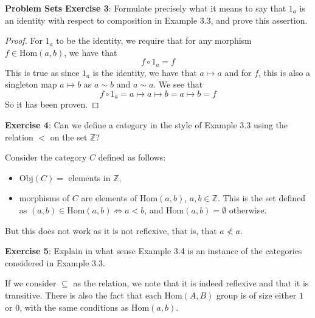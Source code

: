 \documentclass{report}
\begin{document}
\begin{exercises}{\textbf{Problem Sets}}
    \textbf{Exercise 3}: Formulate precisely what it means to say that $1_{a}$ is an identity with respect to composition in Example 3.3, and prove this assertion.
        \begin{proof}
            For $1_{a}$ to be the identity, we require that for any morphism $f \in \text{Hom}(a, b)$, we have that
            \begin{equation*}
                f \circ 1_{a} = f
            \end{equation*}
            This is true as since $1_{a}$ is the identity, we have that $a \mapsto a$ and for $f$, this is also a singleton map $a \mapsto b$ as $a \sim b$ and $a \sim a$. We see that
            \begin{equation*}
                f \circ 1_{a} = a \mapsto a \mapsto b = a \mapsto b = f
            \end{equation*}
            So it has been proven.
        \end{proof}

    \textbf{Exercise 4}: Can we define a category in the style of Example 3.3 using the relation $< $ on the set $\mathbb{Z}$?
        \begin{answer}
            Consider the category $C$ defined as follows:
                \begin{itemize}
                    \item $\text{Obj}(C) = $ elements in $\mathbb{Z}$,

                    \item morphisms of $C$ are elements of $\text{Hom}(a, b)$, $a, b \in \mathbb{Z}$. This is the set defined as $(a, b) \in \text{Hom}(a, b) \iff a < b$, and $\text{Hom}(a, b) = \emptyset$ otherwise.
                \end{itemize}
            But this does not work as it is not reflexive, that is, that $a \not< a$.
        \end{answer}

    \textbf{Exercise 5}: Explain in what sense Example 3.4 is an instance of the categories considered in Example 3.3.
        \begin{answer}
            If we consider $\subseteq $ as the relation, we note that it is indeed reflexive and that it is transitive. There is also the fact that each $\text{Hom}(A, B)$ group is of size either $1$ or $0$, with the same conditions as $\text{Hom}(a, b)$.
        \end{answer}


\end{exercises}
\end{document}
